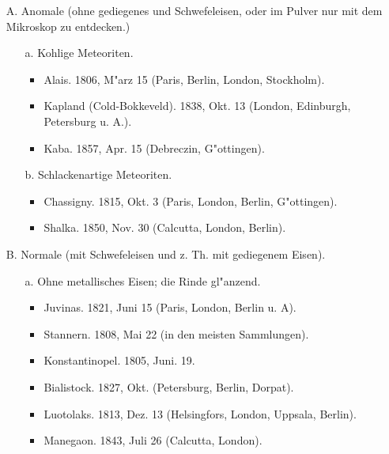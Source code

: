 \documentclass[a4paper, 11pt, oneside]{article}
\begin{document}
\begin{itemize}
    \item[A.] Anomale (ohne gediegenes und Schwefeleisen, oder im Pulver nur mit dem Mikroskop zu entdecken.)
    \begin{itemize}
        \item[a.] Kohlige Meteoriten.
        \begin{itemize}
            \item Alais. 1806, M"arz 15 (Paris, Berlin, London, Stockholm).
        
            \item Kapland (Cold-Bokkeveld). 1838, Okt. 13 (London, Edinburgh, Petersburg u. A.).
        
            \item Kaba. 1857, Apr. 15 (Debreczin, G"ottingen).
        \end{itemize}
        \item[b.] Schlackenartige Meteoriten.
        \begin{itemize}
            \item Chassigny. 1815, Okt. 3 (Paris, London, Berlin, G"ottingen).

            \item Shalka. 1850, Nov. 30 (Calcutta, London, Berlin).
        \end{itemize}
    \end{itemize}
    \item[B.] Normale (mit Schwefeleisen und z. Th. mit gediegenem Eisen).
    \begin{itemize}
        \item[a.] Ohne metallisches Eisen; die Rinde gl"anzend.
        \begin{itemize}
            \item Juvinas. 1821, Juni 15 (Paris, London, Berlin u. A).

            \item Stannern. 1808, Mai 22 (in den meisten Sammlungen).
        
            \item Konstantinopel. 1805, Juni. 19.
        
            \item Bialistock. 1827, Okt. (Petersburg, Berlin, Dorpat).
        
            \item Luotolaks. 1813, Dez. 13 (Helsingfors, London, Uppsala, Berlin). 
        
            \item Manegaon. 1843, Juli 26 (Calcutta, London).
        

\end{itemize}
\end{itemize}
\end{itemize}
\end{document}
